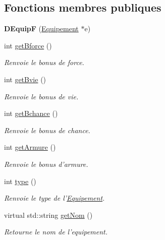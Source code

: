 \subsection*{Fonctions membres publiques}
\begin{DoxyCompactItemize}
\item 
\hypertarget{class_d_equip_f_a81f4d716356576692063657887a471d8}{{\bfseries D\-Equip\-F} (\hyperlink{class_equipement}{Equipement} $\ast$e)}\label{class_d_equip_f_a81f4d716356576692063657887a471d8}

\item 
int \hyperlink{class_d_equip_adb6645ce01c12a4cb3fe0b522ea6b25e}{get\-Bforce} ()
\begin{DoxyCompactList}\small\item\em Renvoie le bonus de force. \end{DoxyCompactList}\item 
int \hyperlink{class_d_equip_a085ea4ac21c238d8c147ff4e6d74794f}{get\-Bvie} ()
\begin{DoxyCompactList}\small\item\em Renvoie le bonus de vie. \end{DoxyCompactList}\item 
int \hyperlink{class_d_equip_a39407c92f0de87306a33f57fd22ce997}{get\-Bchance} ()
\begin{DoxyCompactList}\small\item\em Renvoie le bonus de chance. \end{DoxyCompactList}\item 
int \hyperlink{class_d_equip_a7b2c8227ae884c23ccc8f3a2e5702186}{get\-Armure} ()
\begin{DoxyCompactList}\small\item\em Renvoie le bonus d'armure. \end{DoxyCompactList}\item 
int \hyperlink{class_d_equip_a7c31f807517e5940e899780ac6d7a5c3}{type} ()
\begin{DoxyCompactList}\small\item\em Renvoie le type de l'\hyperlink{class_equipement}{Equipement}. \end{DoxyCompactList}\item 
virtual std\-::string \hyperlink{class_equipement_a0b0426a70bfce6e7c3efac605b75cd8e}{get\-Nom} ()
\begin{DoxyCompactList}\small\item\em Retourne le nom de l'equipement. \end{DoxyCompactList}\end{DoxyCompactItemize}

